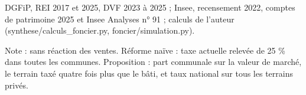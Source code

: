 DGFiP, REI 2017 et 2025, DVF 2023 à 2025 ; Insee, recensement 2022, comptes de patrimoine 2025 et Insee Analyses n° 91 ; calculs de l'auteur (synthese/calculs\_foncier.py, foncier/simulation.py).\par Note : sans réaction des ventes. Réforme naïve : taxe actuelle relevée de 25 \% dans toutes les communes. Proposition : part communale sur la valeur de marché, le terrain taxé quatre fois plus que le bâti, et taux national sur tous les terrains privés.
